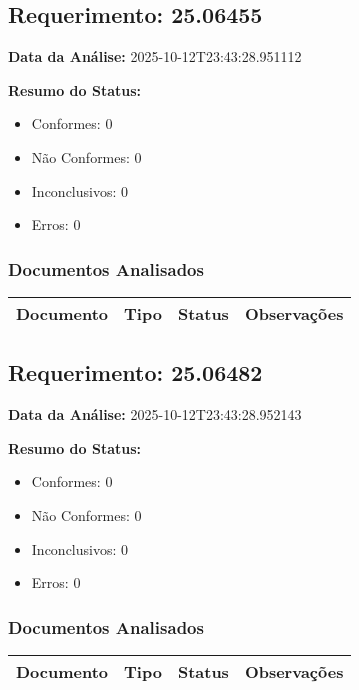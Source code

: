 \documentclass[12pt,a4paper]{article}
\begin{document}
\subsection{Requerimento: 25.06455}

\textbf{Data da Análise:} 2025-10-12T23:43:28.951112

\textbf{Resumo do Status:}
\begin{itemize}
    \item Conformes: 0
    \item Não Conformes: 0
    \item Inconclusivos: 0
    \item Erros: 0
\end{itemize}

\subsubsection{Documentos Analisados}

\begin{longtable}{|p{4cm}|p{2cm}|p{2cm}|p{6cm}|}
\hline
\textbf{Documento} & \textbf{Tipo} & \textbf{Status} & \textbf{Observações} \\
\hline
\endhead
\end{longtable}


\subsection{Requerimento: 25.06482}

\textbf{Data da Análise:} 2025-10-12T23:43:28.952143

\textbf{Resumo do Status:}
\begin{itemize}
    \item Conformes: 0
    \item Não Conformes: 0
    \item Inconclusivos: 0
    \item Erros: 0
\end{itemize}

\subsubsection{Documentos Analisados}

\begin{longtable}{|p{4cm}|p{2cm}|p{2cm}|p{6cm}|}
\hline
\textbf{Documento} & \textbf{Tipo} & \textbf{Status} & \textbf{Observações} \\
\hline
\endhead
\end{longtable}
\end{document}
